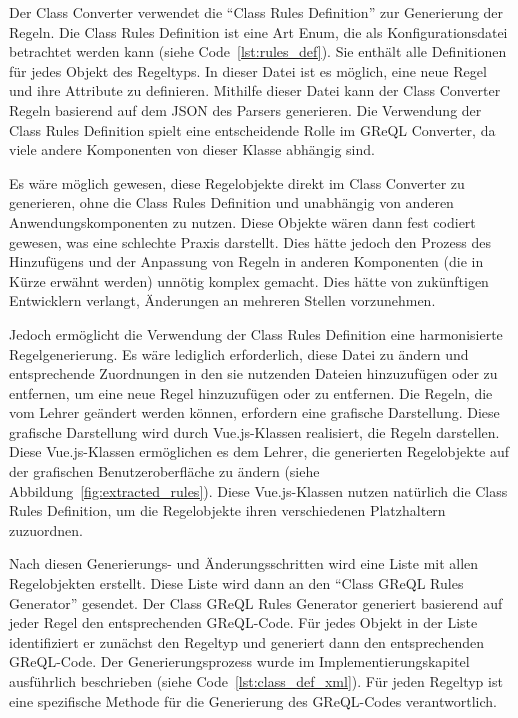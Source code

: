 Der Class Converter verwendet die ``Class Rules Definition'' zur Generierung der Regeln. Die Class Rules Definition ist
eine Art Enum, die als Konfigurationsdatei betrachtet werden kann (siehe Code~\ref{lst:rules_def}). Sie enthält alle
Definitionen für jedes Objekt des Regeltyps. In dieser Datei ist es möglich, eine neue Regel und ihre Attribute zu
definieren. Mithilfe dieser Datei kann der Class Converter Regeln basierend auf dem JSON des Parsers generieren.
Die Verwendung der Class Rules Definition spielt eine entscheidende Rolle im GReQL Converter, da viele andere
Komponenten von dieser Klasse abhängig sind.


Es wäre möglich gewesen, diese Regelobjekte direkt im Class Converter zu generieren, ohne die Class Rules Definition und
unabhängig von anderen Anwendungskomponenten zu nutzen. Diese Objekte wären dann fest codiert gewesen, was eine
schlechte Praxis darstellt. Dies hätte jedoch den Prozess des Hinzufügens und der Anpassung von Regeln in anderen
Komponenten (die in Kürze erwähnt werden) unnötig komplex gemacht. Dies hätte von zukünftigen Entwicklern verlangt,
Änderungen an mehreren Stellen vorzunehmen.


Jedoch ermöglicht die Verwendung der Class Rules Definition eine harmonisierte Regelgenerierung. Es wäre lediglich
erforderlich, diese Datei zu ändern und entsprechende Zuordnungen in den sie nutzenden Dateien hinzuzufügen oder zu
entfernen, um eine neue Regel hinzuzufügen oder zu entfernen. Die Regeln, die vom Lehrer geändert werden können,
erfordern eine grafische Darstellung. Diese grafische Darstellung wird durch Vue.js-Klassen realisiert, die Regeln
darstellen. Diese Vue.js-Klassen ermöglichen es dem Lehrer, die generierten Regelobjekte auf der grafischen
Benutzeroberfläche zu ändern (siehe Abbildung~\ref{fig:extracted_rules}). Diese Vue.js-Klassen nutzen natürlich die
Class Rules Definition, um die Regelobjekte ihren verschiedenen Platzhaltern zuzuordnen.

Nach diesen Generierungs- und Änderungsschritten wird eine Liste mit allen Regelobjekten erstellt. Diese Liste wird
dann an den ``Class GReQL Rules Generator'' gesendet. Der Class GReQL Rules Generator generiert basierend auf jeder
Regel den entsprechenden GReQL-Code. Für jedes Objekt in der Liste identifiziert er zunächst den Regeltyp und generiert
dann den entsprechenden GReQL-Code. Der Generierungsprozess wurde im Implementierungskapitel ausführlich beschrieben
(siehe Code~\ref{lst:class_def_xml}). Für jeden Regeltyp ist eine spezifische Methode für die Generierung des
GReQL-Codes verantwortlich.

